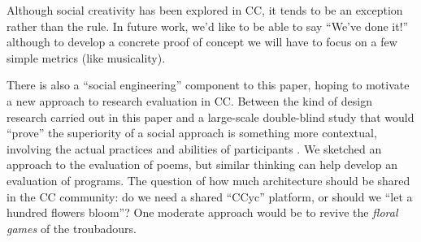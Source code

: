 Although social creativity has been explored in CC, it tends to be an
exception rather than the rule.  In future work, we'd like to be able
to say ``We've done it!'' although to develop a concrete proof of
concept we will have to focus on a few simple metrics (like
musicality).

There is also a ``social engineering'' component to this paper, hoping
to motivate a new approach to research evaluation in CC.  Between the
kind of design research carried out in this paper and a large-scale
double-blind study that would ``prove'' the superiority of a social
approach is something more contextual, involving the actual practices
and abilities of participants
\cite[pp. 167--185]{seikkula2006dialogical}.  We sketched an approach
to the evaluation of poems, but similar thinking can help develop an
evaluation of programs.  The question of how much architecture should
be shared in the CC community: do we need a shared ``CCyc'' platform,
or should we ``let a hundred flowers bloom''?  One moderate approach
would be to revive the \emph{floral games} of the troubadours.

